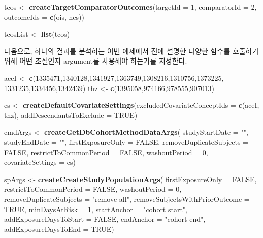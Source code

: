 \documentclass[10.5pt]{book}
\newenvironment{Shaded}{\begin{snugshade}}{\end{snugshade}}
\newcommand{\KeywordTok}[1]{\textcolor[rgb]{0.13,0.29,0.53}{\textbf{#1}}}
\newcommand{\DataTypeTok}[1]{\textcolor[rgb]{0.13,0.29,0.53}{#1}}
\newcommand{\DecValTok}[1]{\textcolor[rgb]{0.00,0.00,0.81}{#1}}
\newcommand{\StringTok}[1]{\textcolor[rgb]{0.31,0.60,0.02}{#1}}
\newcommand{\OtherTok}[1]{\textcolor[rgb]{0.56,0.35,0.01}{#1}}
\newcommand{\NormalTok}[1]{#1}
\theoremstyle{definition}
\theoremstyle{definition}
\theoremstyle{definition}
\theoremstyle{remark}
\begin{document}
\begin{Shaded}
\begin{Highlighting}[]
\NormalTok{tcos <-}\StringTok{ }\KeywordTok{createTargetComparatorOutcomes}\NormalTok{(}\DataTypeTok{targetId =} \DecValTok{1}\NormalTok{,}
                                       \DataTypeTok{comparatorId =} \DecValTok{2}\NormalTok{,}
                                       \DataTypeTok{outcomeIds =} \KeywordTok{c}\NormalTok{(ois, ncs))}

\NormalTok{tcosList <-}\StringTok{ }\KeywordTok{list}\NormalTok{(tcos)}
\end{Highlighting}
\end{Shaded}

다음으로, 하나의 결과를 분석하는 이번 예제에서 전에 설명한 다양한 함수를
호출하기 위해 어떤 조절인자 argument를 사용해야 하는가를 지정한다.

\begin{Shaded}
\begin{Highlighting}[]
\NormalTok{aceI <-}\StringTok{ }\KeywordTok{c}\NormalTok{(}\DecValTok{1335471}\NormalTok{,}\DecValTok{1340128}\NormalTok{,}\DecValTok{1341927}\NormalTok{,}\DecValTok{1363749}\NormalTok{,}\DecValTok{1308216}\NormalTok{,}\DecValTok{1310756}\NormalTok{,}\DecValTok{1373225}\NormalTok{,}
          \DecValTok{1331235}\NormalTok{,}\DecValTok{1334456}\NormalTok{,}\DecValTok{1342439}\NormalTok{)}
\NormalTok{thz <-}\StringTok{ }\KeywordTok{c}\NormalTok{(}\DecValTok{1395058}\NormalTok{,}\DecValTok{974166}\NormalTok{,}\DecValTok{978555}\NormalTok{,}\DecValTok{907013}\NormalTok{)}

\NormalTok{cs <-}\StringTok{ }\KeywordTok{createDefaultCovariateSettings}\NormalTok{(}\DataTypeTok{excludedCovariateConceptIds =} \KeywordTok{c}\NormalTok{(aceI,}
\NormalTok{                                                                     thz),}
                                     \DataTypeTok{addDescendantsToExclude =} \OtherTok{TRUE}\NormalTok{)}

\NormalTok{cmdArgs <-}\StringTok{ }\KeywordTok{createGetDbCohortMethodDataArgs}\NormalTok{(}
  \DataTypeTok{studyStartDate =} \StringTok{""}\NormalTok{,}
  \DataTypeTok{studyEndDate =} \StringTok{""}\NormalTok{,}
  \DataTypeTok{firstExposureOnly =} \OtherTok{FALSE}\NormalTok{,}
  \DataTypeTok{removeDuplicateSubjects =} \OtherTok{FALSE}\NormalTok{,}
  \DataTypeTok{restrictToCommonPeriod =} \OtherTok{FALSE}\NormalTok{,}
  \DataTypeTok{washoutPeriod =} \DecValTok{0}\NormalTok{,}
  \DataTypeTok{covariateSettings =}\NormalTok{ cs)}

\NormalTok{spArgs <-}\StringTok{ }\KeywordTok{createCreateStudyPopulationArgs}\NormalTok{(}
  \DataTypeTok{firstExposureOnly =} \OtherTok{FALSE}\NormalTok{,}
  \DataTypeTok{restrictToCommonPeriod =} \OtherTok{FALSE}\NormalTok{,}
  \DataTypeTok{washoutPeriod =} \DecValTok{0}\NormalTok{,}
  \DataTypeTok{removeDuplicateSubjects =} \StringTok{"remove all"}\NormalTok{,}
  \DataTypeTok{removeSubjectsWithPriorOutcome =} \OtherTok{TRUE}\NormalTok{,}
  \DataTypeTok{minDaysAtRisk =} \DecValTok{1}\NormalTok{,}
  \DataTypeTok{startAnchor =} \StringTok{"cohort start"}\NormalTok{,}
  \DataTypeTok{addExposureDaysToStart =} \OtherTok{FALSE}\NormalTok{,}
  \DataTypeTok{endAnchor =} \StringTok{"cohort end"}\NormalTok{,}
  \DataTypeTok{addExposureDaysToEnd =} \OtherTok{TRUE}\NormalTok{)}


\end{Highlighting}
\end{Shaded}
\end{document}
